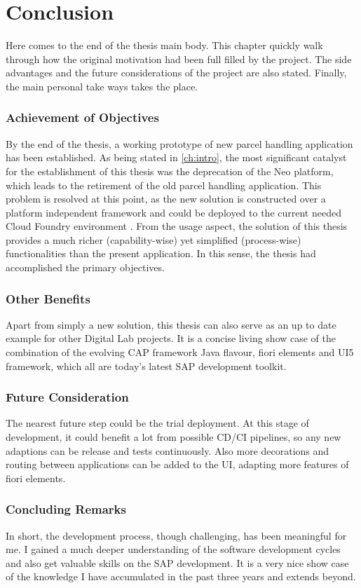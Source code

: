 \chapter*{Conclusion}
\label{ch:sum}


Here comes to the end of the thesis main body.
This chapter quickly walk through how the original motivation had been full filled by the project. The side advantages and the future considerations of the project are also stated. Finally, the main personal take ways takes the place.

\subsection{Achievement of Objectives}
By the end of the thesis, a working prototype of new parcel handling application has been established.
As being stated in \autoref{ch:intro}, the most significant catalyst for the establishment of this thesis was the deprecation of the Neo platform, which leads to the retirement of the old parcel handling application. This problem is resolved at this point, as the new solution is constructed over a platform independent framework and could be deployed to the current needed Cloud Foundry environment \cite{cf}. From the usage aspect, the solution of this thesis provides a much richer (capability-wise) yet simplified (process-wise) functionalities than the present application. In this sense, the thesis had accomplished the primary objectives.

\subsection{Other Benefits}
Apart from simply a new solution, this thesis can also serve as an up to date example for other Digital Lab projects. It is a concise living show case of the combination of the evolving CAP framework Java flavour, fiori elements and UI5 framework, which all are today's latest SAP development toolkit. 

\subsection{Future Consideration}
The nearest future step could be the trial deployment. At this stage of development, it could benefit a lot from possible CD/CI pipelines, so any new adaptions can be release and tests continuously. Also more decorations and routing between applications can be added to the UI, adapting more features of fiori elements.

\subsection{Concluding Remarks}
In short, the development process, though challenging, has been meaningful for me. I gained a much deeper understanding of the software development cycles and also get valuable skills on the SAP development. It is a very nice show case of the knowledge I have accumulated in the past three years and extends beyond.
